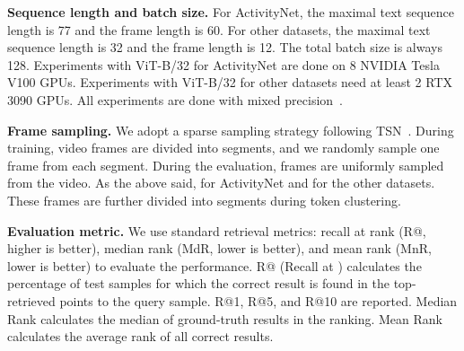 \documentclass[sigconf]{acmart}
\begin{document}
\noindent
\textbf{Sequence length and batch size.}
For ActivityNet, the maximal text sequence length is 77 and
the frame length is 60.
For other datasets, the maximal text sequence length is 32 and
the frame length is 12.
The total batch size is always 128.
Experiments with ViT-B/32 for ActivityNet are done on 8 NVIDIA
Tesla V100 GPUs.
Experiments with ViT-B/32 for other datasets need at least 2 RTX 3090 GPUs.
All experiments are done with mixed precision~\cite{2018_AMP}.

\noindent
\textbf{Frame sampling.}
We adopt a sparse sampling strategy following TSN~\cite{wang2016temporal}.
During training, video frames are divided into  
segments, and we randomly sample one frame from each 
segment.
During the evaluation,  frames are uniformly sampled from the video.
As the above said,  for ActivityNet
and  for the other datasets.
These  frames are further divided into
 segments during token clustering.


\noindent
\textbf{Evaluation metric.}
We use standard retrieval metrics: recall at rank 
(R@, higher is better), median rank (MdR,
lower is better), and mean rank (MnR, lower is
better) to evaluate the performance.
R@ (Recall at ) calculates the percentage of
test samples for which the correct result is found in
the top- retrieved points to the query sample.
R@1, R@5, and R@10 are reported.
Median Rank calculates the
median of ground-truth results in the ranking.
Mean Rank calculates the average rank of
all correct results.
\end{document}
